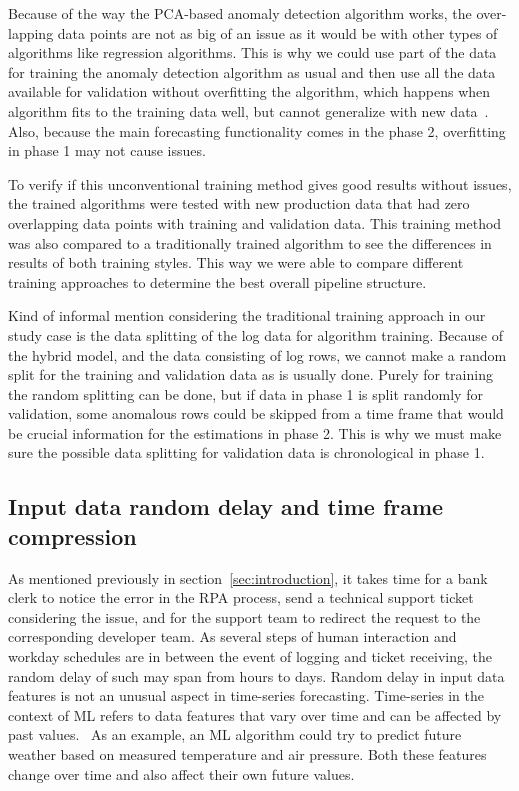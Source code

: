 Because of the way the PCA-based anomaly detection algorithm works,
the over-lapping data points are not as big of an issue
as it would be with other types of algorithms
like regression algorithms.
This is why we could use part of the data
for training the anomaly detection algorithm as usual
and then use all the data available for validation
without overfitting the algorithm,
which happens when algorithm fits to the training data well,
but cannot generalize with new data~\cite{wang2016machine}.
Also, because the main forecasting functionality comes in the phase 2,
overfitting in phase 1 may not cause issues.

To verify if this unconventional training method gives good results without issues,
the trained algorithms were tested with new production data
that had zero overlapping data points with training and validation data.
This training method was also compared to a traditionally trained algorithm
to see the differences in results of both training styles.
This way we were able to compare different training approaches
to determine the best overall pipeline structure.

Kind of informal mention considering
the traditional training approach in our study case
is the data splitting of the log data for algorithm training.
Because of the hybrid model,
and the data consisting of log rows,
we cannot make a random split for the training and validation data
as is usually done.
Purely for training
the random splitting can be done,
but if data in phase 1 is split randomly for validation,
some anomalous rows could be skipped from a time frame
that would be crucial information for the estimations in phase 2.
This is why we must make sure the possible data splitting for validation data
is chronological in phase 1.



\subsection{Input data random delay and time frame compression}\label{subsec:pipe-random-delay-and-timeframe-compression}

As mentioned previously in section~\ref{sec:introduction},
it takes time for a bank clerk to notice the error in the RPA process,
send a technical support ticket considering the issue,
and for the support team to redirect the request to the corresponding developer team.
As several steps of human interaction and workday schedules
are in between the event of logging and ticket receiving,
the random delay of such may span from hours to days.
Random delay in input data features
is not an unusual aspect in time-series forecasting.
Time-series in the context of ML
refers to data features that vary over time
and can be affected by past values.~\cite{palma2016time}
As an example,
an ML algorithm could try to predict future weather
based on measured temperature and air pressure.
Both these features change over time
and also affect their own future values.

